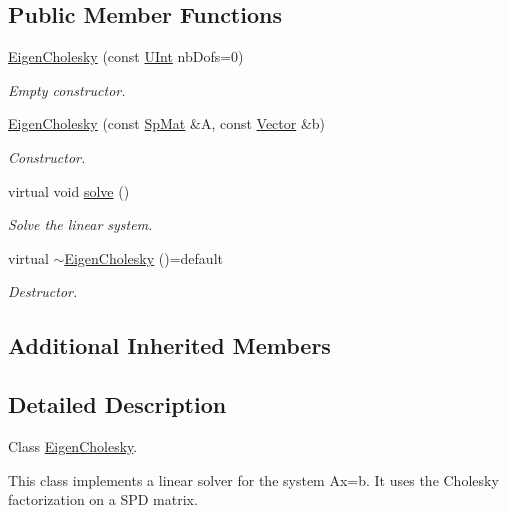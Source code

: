 \subsection*{Public Member Functions}
\begin{DoxyCompactItemize}
\item 
\hyperlink{classFVCode3D_1_1EigenCholesky_a80b86d325dc29bc1ad75f6bceaa832b5}{Eigen\+Cholesky} (const \hyperlink{namespaceFVCode3D_a4bf7e328c75d0fd504050d040ebe9eda}{U\+Int} nb\+Dofs=0)
\begin{DoxyCompactList}\small\item\em Empty constructor. \end{DoxyCompactList}\item 
\hyperlink{classFVCode3D_1_1EigenCholesky_acaae9a0f80fb7c8a7ba5eb0418b70462}{Eigen\+Cholesky} (const \hyperlink{namespaceFVCode3D_ac1032289d96638cf0ad6c52ef639095f}{Sp\+Mat} \&A, const \hyperlink{namespaceFVCode3D_a16ccf345652402bccd1a5d2e6782526c}{Vector} \&b)
\begin{DoxyCompactList}\small\item\em Constructor. \end{DoxyCompactList}\item 
virtual void \hyperlink{classFVCode3D_1_1EigenCholesky_a596379f4aba4ebbdd4c19d08d187580d}{solve} ()
\begin{DoxyCompactList}\small\item\em Solve the linear system. \end{DoxyCompactList}\item 
virtual \hyperlink{classFVCode3D_1_1EigenCholesky_a422932af42625a94486b8b493d7824fd}{$\sim$\+Eigen\+Cholesky} ()=default
\begin{DoxyCompactList}\small\item\em Destructor. \end{DoxyCompactList}\end{DoxyCompactItemize}
\subsection*{Additional Inherited Members}


\subsection{Detailed Description}
Class \hyperlink{classFVCode3D_1_1EigenCholesky}{Eigen\+Cholesky}. 

This class implements a linear solver for the system Ax=b. It uses the Cholesky factorization on a S\+PD matrix. 

